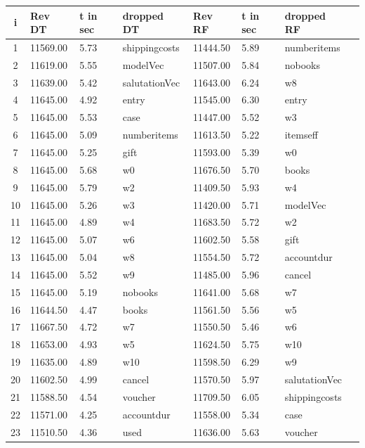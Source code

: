 \begin{table}[]
\centering
\begin{tabular*}{\textwidth}{c @{\extracolsep{\fill}} lllllll}
\toprule
\textbf{i} & \textbf{Rev DT} & \textbf{t in sec} & \textbf{dropped DT} & \textbf{Rev RF} & \textbf{t in sec} &\textbf{dropped RF} \\
\midrule
1 & 11569.00 & 5.73 & shippingcosts & 11444.50 & 5.89 & numberitems \\
2 & 11619.00 & 5.55 & modelVec & 11507.00 & 5.84 & nobooks \\
3 & 11639.00 & 5.42 & salutationVec & 11643.00 & 6.24 & w8 \\
4 & 11645.00 & 4.92 & entry & 11545.00 & 6.30 & entry \\
5 & 11645.00 & 5.53 & case & 11447.00 & 5.52 & w3 \\
6 & 11645.00 & 5.09 & numberitems & 11613.50 & 5.22 & itemseff \\
7 & 11645.00 & 5.25 & gift & 11593.00 & 5.39 & w0 \\
8 & 11645.00 & 5.68 & w0 & 11676.50 & 5.70 & books \\
9 & 11645.00 & 5.79 & w2 & 11409.50 & 5.93 & w4 \\
10 & 11645.00 & 5.26 & w3 & 11420.00 & 5.71 & modelVec \\
11 & 11645.00 & 4.89 & w4 & 11683.50 & 5.72 & w2 \\
12 & 11645.00 & 5.07 & w6 & 11602.50 & 5.58 & gift \\
13 & 11645.00 & 5.04 & w8 & 11554.50 & 5.72 & accountdur \\
14 & 11645.00 & 5.52 & w9 & 11485.00 & 5.96 & cancel \\
15 & 11645.00 & 5.19 & nobooks & 11641.00 & 5.68 & w7 \\
16 & 11644.50 & 4.47 & books & 11561.50 & 5.56 & w5 \\
17 & 11667.50 & 4.72 & w7 & 11550.50 & 5.46 & w6 \\
18 & 11653.00 & 4.93 & w5 & 11624.50 & 5.75 & w10 \\
19 & 11635.00 & 4.89 & w10 & 11598.50 & 6.29 & w9 \\
20 & 11602.50 & 4.99 & cancel & 11570.50 & 5.97 & salutationVec \\
21 & 11588.50 & 4.54 & voucher & 11709.50 & 6.05 & shippingcosts \\
22 & 11571.00 & 4.25 & accountdur & 11558.00 & 5.34 & case \\
23 & 11510.50 & 4.36 & used & 11636.00 & 5.63 & voucher \\

\end{tabular*}
\end{table}
